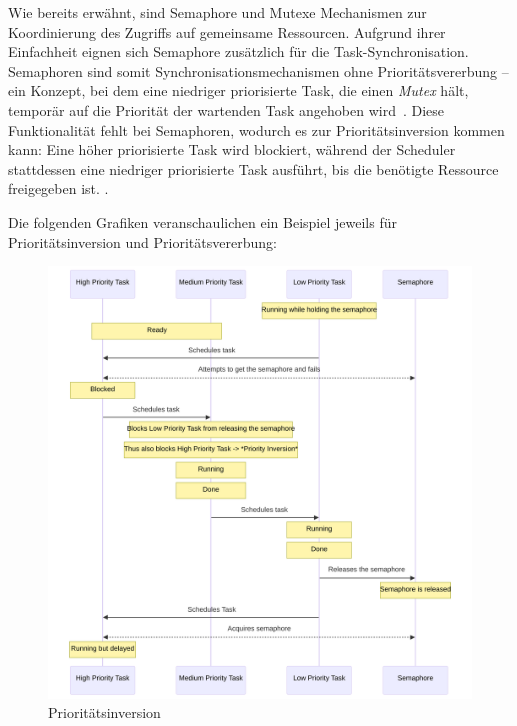 Wie bereits erwähnt, sind Semaphore und Mutexe Mechanismen zur Koordinierung des
Zugriffs auf gemeinsame Ressourcen. Aufgrund ihrer Einfachheit eignen sich
Semaphore zusätzlich für die Task-Synchronisation. Semaphoren sind somit
Synchronisationsmechanismen ohne Prioritätsvererbung -- ein Konzept, bei dem
eine niedriger priorisierte Task, die einen \textit{Mutex} hält, temporär auf
die Priorität der wartenden Task angehoben
wird~\cite{wikipedia_priority_inheritance}. Diese Funktionalität fehlt bei
Semaphoren, wodurch es zur Prioritätsinversion kommen kann: Eine höher
priorisierte Task wird blockiert, während der Scheduler stattdessen eine
niedriger priorisierte Task ausführt, bis die benötigte Ressource freigegeben
ist. \cite{wikipedia_priority_inversion}.

Die folgenden Grafiken veranschaulichen ein Beispiel jeweils für
Prioritätsinversion und Prioritätsvererbung:

\begin{figure}[H]
    \centering
    \includegraphics[width=1\textwidth]{assets/prio_inversion}
    \caption{Prioritätsinversion}
\end{figure}

